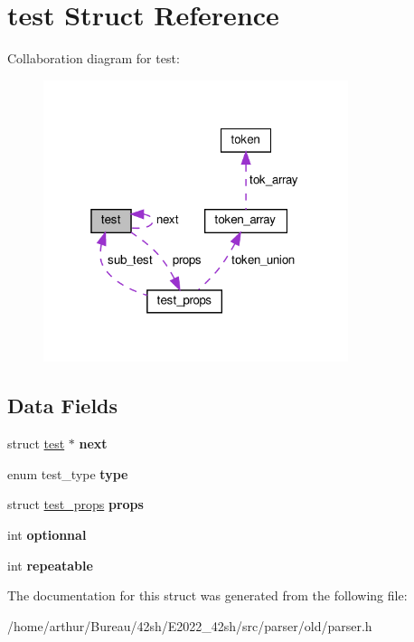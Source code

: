 \hypertarget{structtest}{}\section{test Struct Reference}
\label{structtest}


Collaboration diagram for test\+:
\nopagebreak
\begin{figure}[H]
\begin{center}
\leavevmode
\includegraphics[width=253pt]{structtest__coll__graph}
\end{center}
\end{figure}
\subsection*{Data Fields}
\begin{DoxyCompactItemize}
\item 
\mbox{\label{structtest_a7563368b5c883cfa05d8c97a7793f13f}} 
struct \hyperlink{structtest}{test} $\ast$ {\bfseries next}
\item 
\mbox{\label{structtest_a85f3aaaabdfd3167711ad791fe8b5c08}} 
enum test\+\_\+type {\bfseries type}
\item 
\mbox{\label{structtest_acc5f31184b473cd6564fc471480652ef}} 
struct \hyperlink{structtest__props}{test\+\_\+props} {\bfseries props}
\item 
\mbox{\label{structtest_ac0506bb48e3563914a6ee4fd900c4ce9}} 
int {\bfseries optionnal}
\item 
\mbox{\label{structtest_a4fd618b09353404d729bb9ede72202f5}} 
int {\bfseries repeatable}
\end{DoxyCompactItemize}


The documentation for this struct was generated from the following file\+:\begin{DoxyCompactItemize}
\item 
/home/arthur/\+Bureau/42sh/\+E2022\+\_\+42sh/src/parser/old/parser.\+h\end{DoxyCompactItemize}
